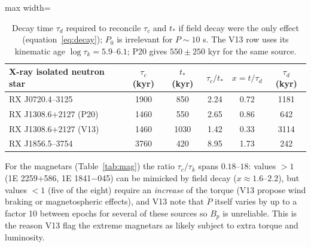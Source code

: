 \documentclass[11pt,a4paper]{article}
\begin{document}
\begin{table}[htbp]
\centering\small
\caption{Decay time $\tau_d$ required to reconcile $\tau_c$ and $t_*$ if field decay were the only effect (equation~\ref{eq:decay}); $P_0$ is irrelevant for $P\sim10$ s. The V13 row uses its kinematic age $\log\tau_k=5.9$--$6.1$; P20 gives $550\pm250$ kyr for the same source.}\label{tab:dec}
\begin{adjustbox}{max width=\textwidth}\begin{tabular}{lccccc}
\toprule
X-ray isolated neutron star & $\tau_c$ (kyr) & $t_*$ (kyr) & $\tau_c/t_*$ & $x=t/\tau_d$ & $\tau_d$ (kyr)\\
\midrule
RX J0720.4--3125 & 1900 & 850 & 2.24 & 0.72 & 1181\\
RX J1308.6+2127 (P20) & 1460 & 550 & 2.65 & 0.86 & 642\\
RX J1308.6+2127 (V13) & 1460 & 1030 & 1.42 & 0.33 & 3114\\
RX J1856.5--3754 & 3760 & 420 & 8.95 & 1.73 & 242\\
\bottomrule
\end{tabular}\end{adjustbox}
\end{table}


For the magnetars (Table~\ref{tab:mag}) the ratio $\tau_c/\tau_k$ spans $0.18$--$18$: values $>1$ (1E 2259+586, 1E 1841$-$045) can be mimicked by field decay ($x\approx1.6$--$2.2$), but values $<1$ (five of the eight) require an \emph{increase} of the torque (V13 propose wind braking or magnetospheric effects), and V13 note that $\dot P$ itself varies by up to a factor 10 between epochs for several of these sources so $B_p$ is unreliable. This is the reason V13 flag the extreme magnetars as likely subject to extra torque and luminosity.
\end{document}
